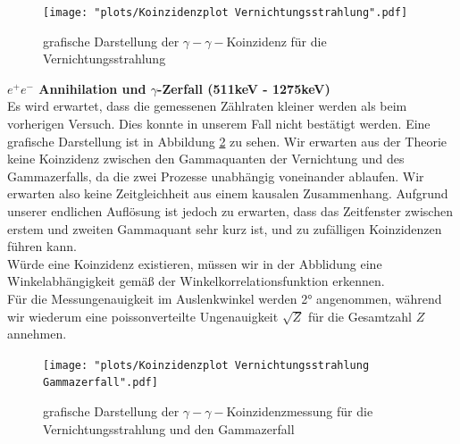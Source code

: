 \documentclass[%
aps,
onecolumn,
11pt,
tightenlines,
nofootinbib,
superscriptaddress,
floatfix,
prd,
]{revtex4-2}
\begin{document}
\begin{figure}[H]
	\centering
	\texttt{[image: "plots/Koinzidenzplot Vernichtungsstrahlung".pdf]}
	\caption{grafische Darstellung der $\gamma - \gamma -$Koinzidenz für die Vernichtungsstrahlung}
	\label{fig:coincidenceannihilation}
\end{figure}

\textbf{$e^+e^- $ Annihilation und $\gamma$-Zerfall (511keV - 1275keV)}\\
Es wird erwartet, dass die gemessenen Zählraten kleiner werden als beim vorherigen Versuch. Dies konnte in unserem Fall nicht bestätigt werden. Eine grafische Darstellung ist in Abbildung \ref{fig:coincidenceannihilgamma} zu sehen. Wir erwarten aus der Theorie keine Koinzidenz zwischen den Gammaquanten der Vernichtung und des Gammazerfalls, da die zwei Prozesse unabhängig voneinander ablaufen. Wir erwarten also keine Zeitgleichheit aus einem kausalen Zusammenhang. Aufgrund unserer endlichen Auflösung ist jedoch zu erwarten, dass das Zeitfenster zwischen erstem und zweiten Gammaquant sehr kurz ist, und zu zufälligen Koinzidenzen führen kann. \\
Würde eine Koinzidenz existieren, müssen wir in der Abblidung eine Winkelabhängigkeit gemäß der Winkelkorrelationsfunktion erkennen. \\
Für die Messungenauigkeit im Auslenkwinkel werden 2° angenommen, während wir wiederum eine poissonverteilte Ungenauigkeit $\sqrt{Z}$ für die Gesamtzahl $Z$ annehmen. 

\begin{figure}[H]
	\centering
	\texttt{[image: "plots/Koinzidenzplot Vernichtungsstrahlung Gammazerfall".pdf]}
	\caption{grafische Darstellung der $\gamma - \gamma -$Koinzidenzmessung für die Vernichtungsstrahlung und den Gammazerfall}
	\label{fig:coincidenceannihilgamma}
\end{figure}
\end{document}
